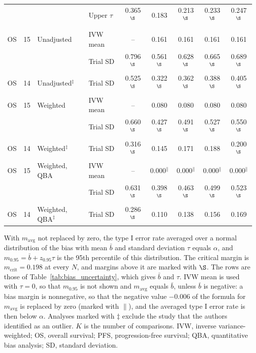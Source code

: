 \begin{table}[!htb]
\begin{tabular}{lcllccccc}
 &  &  & Upper $\tau$ & 0.365$^{\S}$ & 0.183 & 0.213$^{\S}$ & 0.233$^{\S}$ & 0.247$^{\S}$ \\
\addlinespace
\multicolumn{9}{l}{Gupta et al.~\cite{Gupta2025}} \\
OS & 15 & Unadjusted & IVW mean & -- & 0.161 & 0.161 & 0.161 & 0.161 \\
 &  &  & Trial SD & 0.796$^{\S}$ & 0.561$^{\S}$ & 0.628$^{\S}$ & 0.665$^{\S}$ & 0.689$^{\S}$ \\
OS & 14 & Unadjusted$^{\ddagger}$ & Trial SD & 0.525$^{\S}$ & 0.322$^{\S}$ & 0.362$^{\S}$ & 0.388$^{\S}$ & 0.405$^{\S}$ \\
OS & 15 & Weighted & IVW mean & -- & 0.080 & 0.080 & 0.080 & 0.080 \\
 &  &  & Trial SD & 0.660$^{\S}$ & 0.427$^{\S}$ & 0.491$^{\S}$ & 0.527$^{\S}$ & 0.550$^{\S}$ \\
OS & 14 & Weighted$^{\ddagger}$ & Trial SD & 0.316$^{\S}$ & 0.145 & 0.171 & 0.188 & 0.200$^{\S}$ \\
OS & 15 & Weighted, QBA & IVW mean & -- & 0.000$^{\|}$ & 0.000$^{\|}$ & 0.000$^{\|}$ & 0.000$^{\|}$ \\
 &  &  & Trial SD & 0.631$^{\S}$ & 0.398$^{\S}$ & 0.463$^{\S}$ & 0.499$^{\S}$ & 0.523$^{\S}$ \\
OS & 14 & Weighted, QBA$^{\ddagger}$ & Trial SD & 0.286$^{\S}$ & 0.110 & 0.138 & 0.156 & 0.169 \\
\bottomrule
\end{tabular}
\par\smallskip
\begin{minipage}{0.95\linewidth}
\footnotesize
With $m_{\mathrm{avg}}$ not replaced by zero, the type I error rate averaged over a normal distribution of the bias with mean $\bar{b}$ and standard deviation $\tau$ equals $\alpha$, and $m_{0.95} = \bar{b} + z_{0.95}\tau$ is the 95th percentile of this distribution. The critical margin is $m_{\mathrm{crit}} = 0.198$ at every $N$, and margins above it are marked with $\S$. The rows are those of Table~\ref{tab:bias_uncertainty}, which gives $\bar{b}$ and $\tau$. IVW mean is used with $\tau = 0$, so that $m_{0.95}$ is not shown and $m_{\mathrm{avg}}$ equals $\bar{b}$, unless $\bar{b}$ is negative: a bias margin is nonnegative, so that the negative value $-$0.006 of the formula for $m_{\mathrm{avg}}$ is replaced by zero (marked with $\|$), and the averaged type I error rate is then below $\alpha$. Analyses marked with $\ddagger$ exclude the study that the authors identified as an outlier. $K$ is the number of comparisons. IVW, inverse variance-weighted; OS, overall survival; PFS, progression-free survival; QBA, quantitative bias analysis; SD, standard deviation.
\end{minipage}
\end{table}
